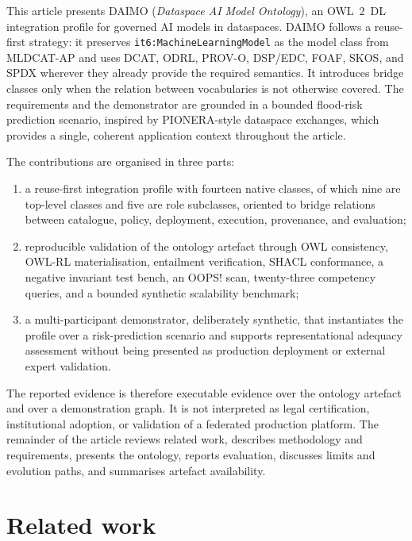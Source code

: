 \documentclass[Afour,sagev,times]{sagej}
\newcommand{\code}[1]{\texttt{#1}}
\begin{document}
This article presents DAIMO (\emph{Dataspace AI Model Ontology}), an OWL~2~DL integration profile for governed AI models in dataspaces. DAIMO follows a reuse-first strategy: it preserves \code{it6:MachineLearningModel} as the model class from MLDCAT-AP and uses DCAT, ODRL, PROV-O, DSP/EDC, FOAF, SKOS, and SPDX wherever they already provide the required semantics. It introduces bridge classes only when the relation between vocabularies is not otherwise covered. The requirements and the demonstrator are grounded in a bounded flood-risk prediction scenario, inspired by PIONERA-style dataspace exchanges, which provides a single, coherent application context throughout the article.

The contributions are organised in three parts:

\begin{enumerate}[leftmargin=*]
\item a reuse-first integration profile with fourteen native classes, of which nine are top-level classes and five are role subclasses, oriented to bridge relations between catalogue, policy, deployment, execution, provenance, and evaluation;
\item reproducible validation of the ontology artefact through OWL consistency, OWL-RL materialisation, entailment verification, SHACL conformance, a negative invariant test bench, an OOPS! scan, twenty-three competency queries, and a bounded synthetic scalability benchmark;
\item a multi-participant demonstrator, deliberately synthetic, that instantiates the profile over a risk-prediction scenario and supports representational adequacy assessment without being presented as production deployment or external expert validation.
\end{enumerate}

The reported evidence is therefore executable evidence over the ontology artefact and over a demonstration graph. It is not interpreted as legal certification, institutional adoption, or validation of a federated production platform. The remainder of the article reviews related work, describes methodology and requirements, presents the ontology, reports evaluation, discusses limits and evolution paths, and summarises artefact availability.


\section{Related work}\label{sec:related}
\end{document}
